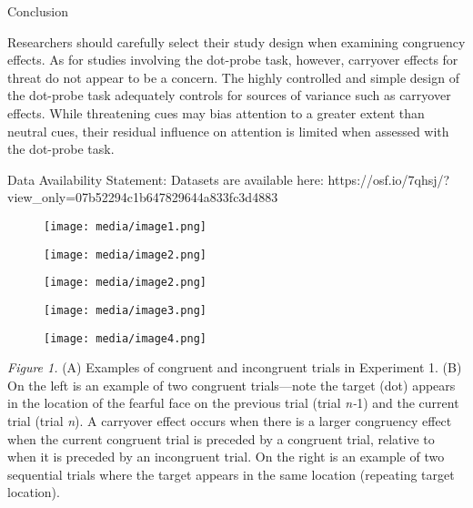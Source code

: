 \documentclass{article}
\begin{document}
{	Conclusion



	Researchers should carefully select their study design when examining congruency effects. As for studies involving the dot-probe task, however, carryover effects for threat do not appear to be a concern. The highly controlled and simple design of the dot-probe task adequately controls for sources of variance such as carryover effects. While threatening cues may bias attention to a greater extent than neutral cues, their residual influence on attention is limited when assessed with the dot-probe task.



	Data Availability Statement:\emph{ }Datasets are available here: https://osf.io/7qhsj/?view_only=07b52294c1b647829644a833fc3d4883







	\begin{figure}
		\caption{}

		\label{fig:rId11}

		\texttt{[image: media/image1.png]}
	\end{figure}
	\begin{figure}
		\caption{}

		\label{fig:rId12}

		\texttt{[image: media/image2.png]}
	\end{figure}
	\begin{figure}
		\caption{}

		\label{fig:rId12}

		\texttt{[image: media/image2.png]}
	\end{figure}
	\begin{figure}
		\caption{}

		\label{fig:rId13}

		\texttt{[image: media/image3.png]}
	\end{figure}
	\begin{figure}
		\caption{}

		\label{fig:rId14}

		\texttt{[image: media/image4.png]}
	\end{figure}



	\emph{Figure 1. }(A) Examples of congruent and incongruent trials in Experiment 1. (B) On the left is an example of two congruent trials—note the target (dot) appears in the location of the fearful face on the previous trial (trial \emph{n-}1) and the current trial (trial \emph{n}). A carryover effect occurs when there is a larger congruency effect when the current congruent trial is preceded by a congruent trial, relative to when it is preceded by an incongruent trial. On the right is an example of two sequential trials where the target appears in the same location (repeating target location).



}
\end{document}
